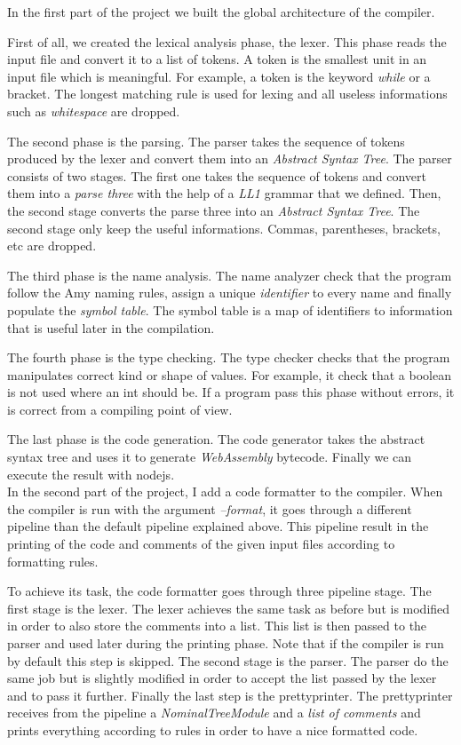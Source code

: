 In the first part of the project we built the global architecture of the compiler. 

First of all, we created the lexical analysis phase, the lexer. This phase reads the input file and convert it to a list of tokens. A token is the smallest unit in an input file which is meaningful. For example, a token is the keyword \emph{while} or a bracket. The longest matching rule is used for lexing and all useless informations such as \emph{whitespace} are dropped.

The second phase is the parsing. The parser takes the sequence of tokens produced by the lexer and convert them into an \emph{Abstract Syntax Tree}. The parser consists of two stages. The first one takes the sequence of tokens and convert them into a \emph{parse three} with the help of a \emph{LL1} grammar that we defined. Then, the second stage converts the parse three into an \emph{Abstract Syntax Tree}. The second stage only keep the useful informations. Commas, parentheses, brackets, etc are dropped.

The third phase is the name analysis. The name analyzer check that the program follow the Amy naming rules, assign a unique \emph{identifier} to every name and finally populate the \emph{symbol table}. The symbol table is a map of identifiers to information that is useful later in the compilation.

The fourth phase is the type checking. The type checker checks that the program manipulates correct kind or shape of values. For example, it check that a boolean is not used where an int should be. If a program pass this phase without errors, it is correct from a compiling point of view.

The last phase is the code generation. The code generator takes the abstract syntax tree and uses it to generate \emph{WebAssembly} bytecode. Finally we can execute the result with nodejs.\\

In the second part of the project, I add a code formatter to the compiler. When the compiler is run with the argument \emph{--format}, it goes through a different pipeline than the default pipeline explained above. This pipeline result in the printing of the code and comments of the given input files according to formatting rules.

To achieve its task, the code formatter goes through three pipeline stage.
The first stage is the lexer. The lexer achieves the same task as before but is modified in order to also store the comments into a list. This list is then passed to the parser and used later during the printing phase. Note that if the compiler is run by default this step is skipped.
The second stage is the parser. The parser do the same job but is slightly modified in order to accept the list passed by the lexer and to pass it further. 
Finally the last step is the prettyprinter. The prettyprinter receives from the pipeline a \emph{NominalTreeModule} and a \emph{list of comments} and prints everything according to rules in order to have a nice formatted code.




